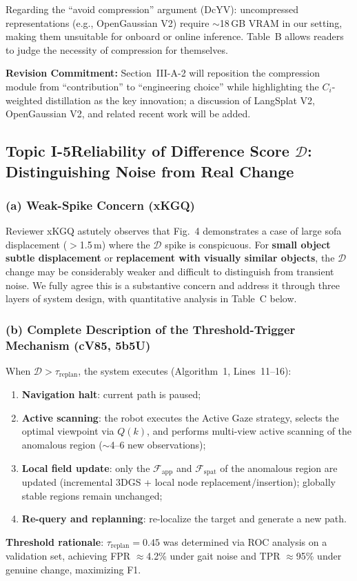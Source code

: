 \documentclass[10pt,a4paper]{article}
\newcommand{\revs}[1]{\smallskip\noindent{\small\color{notegray}\textit{Addressed to: #1}}\smallskip}
\newcommand{\commitbox}[1]{\smallskip\noindent\textbf{Revision Commitment:} #1\smallskip}
\begin{document}
Regarding the ``avoid compression'' argument (DcYV): uncompressed representations (e.g., OpenGaussian V2) require ${\sim}$18\,GB VRAM in our setting, making them unsuitable for onboard or online inference. Table~B allows readers to judge the necessity of compression for themselves.

\commitbox{Section~III-A-2 will reposition the compression module from ``contribution'' to ``engineering choice'' while highlighting the $C_i$-weighted distillation as the key innovation; a discussion of LangSplat V2, OpenGaussian V2, and related recent work will be added.}

\subsection*{Topic I-5\enspace Reliability of Difference Score $\mathcal{D}$: Distinguishing Noise from Real Change}
\revs{5b5U (Q6c), cV85 (Q7), xKGQ (Q2)}

\subsubsection*{(a) Weak-Spike Concern (xKGQ)}

Reviewer xKGQ astutely observes that Fig.~4 demonstrates a case of large sofa displacement ($>$1.5\,m) where the $\mathcal{D}$ spike is conspicuous. For \textbf{small object subtle displacement} or \textbf{replacement with visually similar objects}, the $\mathcal{D}$ change may be considerably weaker and difficult to distinguish from transient noise. We fully agree this is a substantive concern and address it through three layers of system design, with quantitative analysis in Table~C below.

\subsubsection*{(b) Complete Description of the Threshold-Trigger Mechanism (cV85, 5b5U)}

When $\mathcal{D}>\tau_{\text{replan}}$, the system executes (Algorithm~1, Lines~11--16):
\begin{enumerate}[leftmargin=2em,topsep=2pt,itemsep=1pt]
  \item \textbf{Navigation halt}: current path is paused;
  \item \textbf{Active scanning}: the robot executes the Active Gaze strategy, selects the optimal viewpoint via $Q(k)$, and performs multi-view active scanning of the anomalous region (${\sim}$4--6 new observations);
  \item \textbf{Local field update}: only the $\mathcal{F}_{\text{app}}$ and $\mathcal{F}_{\text{spat}}$ of the anomalous region are updated (incremental 3DGS + local node replacement/insertion); globally stable regions remain unchanged;
  \item \textbf{Re-query and replanning}: re-localize the target and generate a new path.
\end{enumerate}
\textbf{Threshold rationale}: $\tau_{\text{replan}}=0.45$ was determined via ROC analysis on a validation set, achieving FPR $\approx$4.2\% under gait noise and TPR $\approx$95\% under genuine change, maximizing F1.
\end{document}
